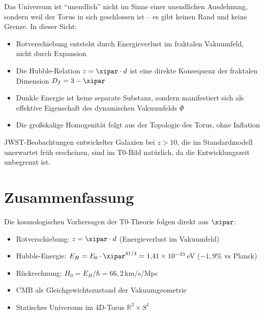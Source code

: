 Das Universum ist ``unendlich'' nicht im Sinne einer unendlichen Ausdehnung, 
sondern weil der Torus in sich geschlossen ist -- es gibt keinen Rand und 
keine Grenze. In dieser Sicht:

\begin{itemize}
\item Rotverschiebung entsteht durch Energieverlust im fraktalen Vakuumfeld, 
nicht durch Expansion
\item Die Hubble-Relation $z = \xipar \cdot d$ ist eine direkte Konsequenz 
der fraktalen Dimension $D_f = 3 - \xipar$
\item Dunkle Energie ist keine separate Substanz, sondern manifestiert sich 
als effektive Eigenschaft des dynamischen Vakuumfelds $\Phi$
\item Die großskalige Homogenität folgt aus der Topologie des Torus, ohne 
Inflation
\end{itemize}

JWST-Beobachtungen entwickelter Galaxien bei $z > 10$, die im 
Standardmodell unerwartet früh erscheinen, sind im T0-Bild natürlich, da 
die Entwicklungszeit unbegrenzt ist.

\section{Zusammenfassung}

Die kosmologischen Vorhersagen der T0-Theorie folgen direkt aus $\xipar$:

\begin{itemize}
\item Rotverschiebung: $z = \xipar \cdot d$ (Energieverlust im Vakuumfeld)
\item Hubble-Energie: $E_H = E_0 \cdot \xipar^{41/4} = 1{,}41 \times 10^{-33}\,$eV 
($-1{,}9\%$ vs Planck)
\item Rückrechnung: $H_0 = E_H / \hbar = 66{,}2\,$km/s/Mpc
\item CMB als Gleichgewichtszustand der Vakuumgeometrie
\item Statisches Universum im 4D-Torus $\mathbb{R}^3 \times S^1$
\end{itemize}

